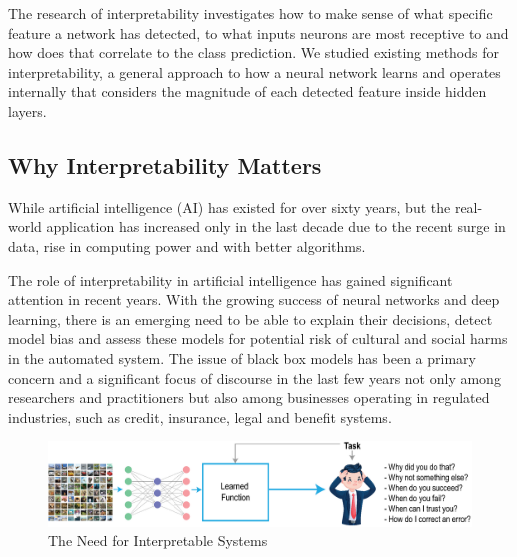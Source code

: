The research of interpretability investigates how to make sense of what specific feature a network has detected, to what inputs neurons are most receptive to and how does that correlate to the class prediction. We studied existing methods for interpretability, a general approach to how a neural network learns and operates internally that considers the magnitude of each detected feature inside hidden layers.

\subsection{Why Interpretability Matters}

While artificial intelligence (AI) has existed for over sixty years, but the real-world application has increased only in the last decade due to the recent surge in data, rise in computing power and with better algorithms.

The role of interpretability in artificial intelligence has gained significant attention in recent years. With the growing success of neural networks and deep learning, there is an emerging need to be able to explain their decisions, detect model bias and assess these models for potential risk of cultural and social harms in the automated system. The issue of black box models has been a primary concern and a significant focus of discourse in the last few years not only among researchers and practitioners \cite{Samek} but also among businesses operating in regulated industries, such as credit, insurance, legal and benefit systems.

\begin{figure}[htbp]
\centering
\includegraphics[width=1\textwidth]{images/xa-concept-part-1.eps}
\caption{The Need for Interpretable Systems \protect\footnotemark}
\label{fig:The Need for Interpretable Systems}
\end{figure}

